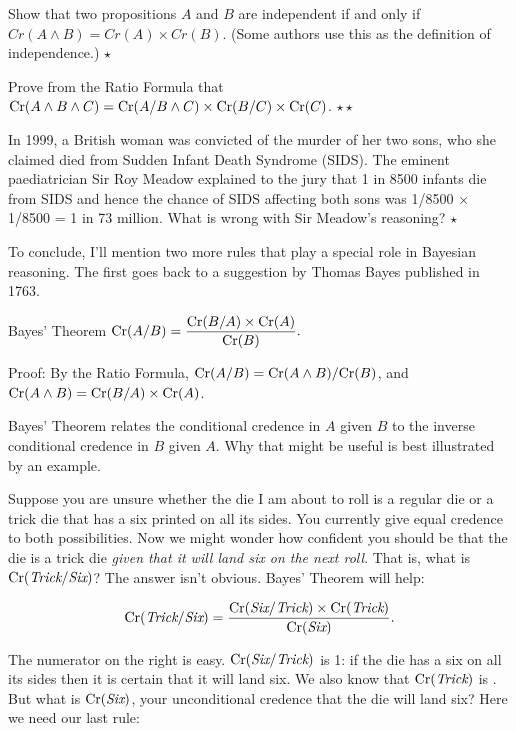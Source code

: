 \begin{exercise}
  Show that two propositions $A$ and $B$ are independent if and only
  if $Cr(A \land B) = Cr(A) \times Cr(B)$. (Some authors use this as
  the definition of independence.) $\star$
\end{exercise}

\begin{exercise}\label{e:chain-rule}
  Prove from the Ratio Formula that $\text{Cr}(A \land B \land C) = \text{Cr}(A/B
  \land C) \times \text{Cr}(B/C) \times \text{Cr}(C)$. $\star\star$
\end{exercise}

\begin{exercise}
  In 1999, a British woman was convicted of the murder of her two
  sons, who she claimed died from Sudden Infant Death Syndrome
  (SIDS). The eminent paediatrician Sir Roy Meadow explained to the
  jury that 1 in 8500 infants die from SIDS and hence the chance of
  SIDS affecting both sons was 1/8500 $\times$ 1/8500 = 1 in 73
  million. What is wrong with Sir Meadow's reasoning? $\star$
\end{exercise}

To conclude, I'll mention two more rules that play a special role in
Bayesian reasoning. The first goes back to a suggestion by Thomas
Bayes published in 1763.
%
\begin{genericthm}{Bayes' Theorem}
  $\text{Cr}(A/B) = \dfrac{\text{Cr}(B/A) \times \text{Cr}(A)}{\text{Cr}(B)}.$
\end{genericthm}
%
Proof: By the Ratio Formula, $\text{Cr}(A/B) = \text{Cr}(A \land B) / \text{Cr}(B)$, and
$\text{Cr}(A \land B) = \text{Cr}(B/A) \times \text{Cr}(A)$.

Bayes' Theorem relates the conditional credence in $A$ given $B$ to the
inverse conditional credence in $B$ given $A$. Why that might be
useful is best illustrated by an example.

Suppose you are unsure whether the die I am about to roll is a regular
die or a trick die that has a six printed on all its sides. You
currently give equal credence to both possibilities. Now we might
wonder how confident you should be that the die is a trick die
\emph{given that it will land six on the next roll}. That is, what is
$\text{Cr}(\emph{Trick}/ \emph{Six})$? The answer isn't obvious. Bayes'
Theorem will help:

\[
  \text{Cr}(\emph{Trick}/\emph{Six}) = \frac{\text{Cr}(\emph{Six}/\emph{Trick}) \times \text{Cr}(\emph{Trick})}{\text{Cr}(\emph{Six})}.
\]

The numerator on the right is easy. $\text{Cr}(\emph{Six}/ \emph{Trick})$ is
1: if the die has a six on all its sides then it is certain that it
will land six. We also know that $\text{Cr}(\emph{Trick})$ is
. But what is $\text{Cr}(\emph{Six})$, your unconditional
credence that the die will land six? Here we need our last rule:

